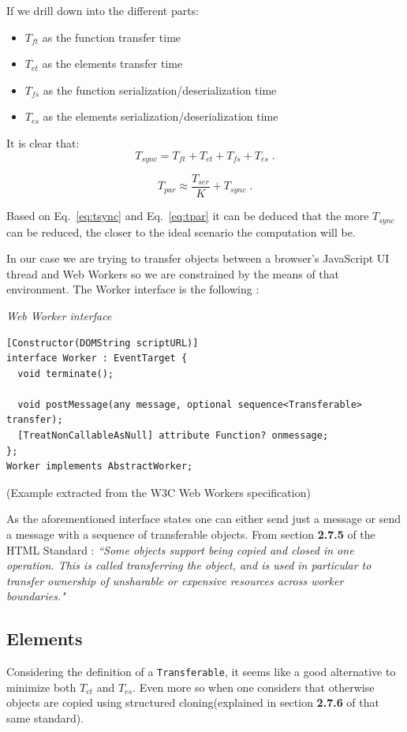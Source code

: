\documentclass[runningheads,a4paper]{llncs}
\begin{document}
If we drill down into the different parts:
\begin{itemize}
  \item \(T_{ft}\) as the function transfer time
  \item \(T_{et}\) as the elements transfer time
  \item \(T_{fs}\) as the function serialization/deserialization time
  \item \(T_{es}\) as the elements serialization/deserialization time
\end{itemize}

It is clear that:
\begin{equation}
  T_{sync} = T_{ft} + T_{et} + T_{fs} + T_{es} \;  .
  \label{eq:tsync}
\end{equation}

\begin{equation}
  T_{par} \approx \frac{T_{ser}}{K} + T_{sync} \;  .
  \label{eq:tpar}
\end{equation}

Based on Eq.~\ref{eq:tsync} and Eq.~\ref{eq:tpar} it can be deduced that the more \(T_{sync}\) can be reduced, the closer to the ideal scenario the computation will be.

In our case we are trying to transfer objects between a browser's JavaScript UI thread and Web Workers so we are constrained by the means of that environment. The Worker interface is the following \cite{w3c-ww}:
\medskip

\noindent
{\it Web Worker interface}
\begin{verbatim}
[Constructor(DOMString scriptURL)]
interface Worker : EventTarget {
  void terminate();

  void postMessage(any message, optional sequence<Transferable> transfer);
  [TreatNonCallableAsNull] attribute Function? onmessage;
};
Worker implements AbstractWorker;
\end{verbatim}
%
\noindent
{\small (Example extracted from the W3C Web Workers specification)}

As the aforementioned interface states one can either send just a message or send a message with a sequence of transferable objects. From section \textbf{2.7.5} of the HTML Standard \cite{html-whatwg}:
\textit{``Some objects support being copied and closed in one operation. This is called transferring the object, and is used in particular to transfer ownership of unsharable or expensive resources across worker boundaries."}

\subsection{Elements}
Considering the definition of a \verb+Transferable+, it seems like a good alternative to minimize both \(T_{et}\) and \(T_{es}\). Even more so when one considers that otherwise objects are copied using structured cloning(explained in section \textbf{2.7.6} of that same standard).
\end{document}
